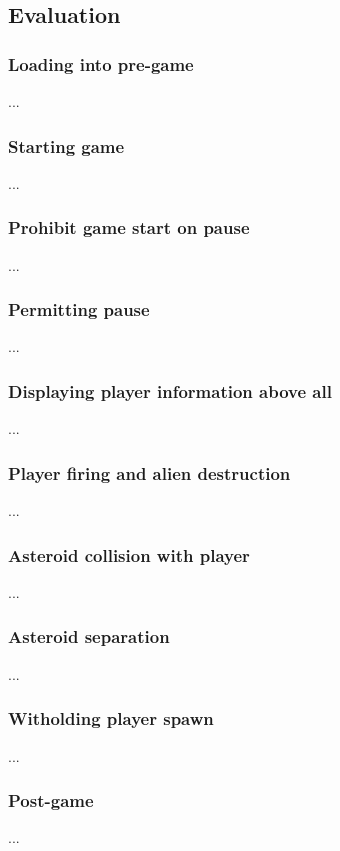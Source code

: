 \documentclass[12pt, titlepage]{article}
\begin{document}
\subsection{Evaluation}
\subsubsection{Loading into pre-game}
...\\
\subsubsection{Starting game}
...\\
\subsubsection{Prohibit game start on pause}
...\\
\subsubsection{Permitting pause}
...\\
\subsubsection{Displaying player information above all}
...\\
\subsubsection{Player firing and alien destruction}
...\\
\subsubsection{Asteroid collision with player}
...\\
\subsubsection{Asteroid separation}
...\\
\subsubsection{Witholding player spawn}
...\\
\subsubsection{Post-game}
...\\
\end{document}
